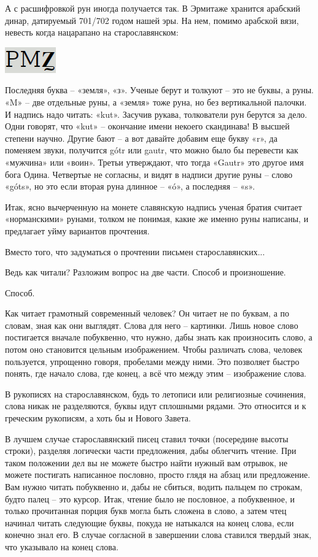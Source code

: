 А с расшифровкой рун иногда получается так. В Эрмитаже хранится арабский динар, датируемый 701/702 годом нашей эры. На нем, помимо арабской вязи, невесть когда нацарапано на старославянском:

\begin{center}
\includegraphics[width=0.20\linewidth]{chast-colebanie-osnov/letyaz/pmz.png}
\end{center} 

Последняя буква – «земля», «з». Ученые берут и толкуют – это не буквы, а руны. «M» – две отдельные руны, а «земля» тоже руна, но без вертикальной палочки. И надпись надо читать: «kut». Засучив рукава, толкователи рун берутся за дело. Одни говорят, что «kut» – окончание имени некоего скандинава! В высшей степени научно. Другие бают – а вот давайте добавим еще букву «r», да поменяем звуки, получится gótr или gautr, что можно было бы перевести как «мужчина» или «воин». Третьи утверждают, что тогда «Gautr» это другое имя бога Одина. Четвертые не согласны, и видят в надписи другие руны – слово «góts», но это если вторая руна длинное – «ó», а последняя – «s».

Итак, ясно вычерченную на монете славянскую надпись ученая братия считает «норманскими» рунами, толком не понимая, какие же именно руны написаны, и предлагает уйму вариантов прочтения.

Вместо того, что задуматься о прочтении письмен старославянских...

Ведь как читали? Разложим вопрос на две части. Способ и произношение.

Способ. 

Как читает грамотный современный человек? Он читает не по буквам, а по словам, зная как они выглядят. Слова для него – картинки. Лишь новое слово постигается вначале побуквенно, что нужно, дабы знать как произносить слово, а потом оно становится цельным изображением. Чтобы различать слова, человек пользуется, упрощенно говоря, пробелами между ними. Это позволяет быстро понять, где начало слова, где конец, а всё что между этим – изображение слова.

В рукописях на старославянском, будь то летописи или религиозные сочинения, слова никак не разделяются, буквы идут сплошными рядами. Это относится и к греческим рукописям, а хоть бы и Нового Завета.

В лучшем случае старославянский писец ставил точки (посередине высоты строки), разделяя логически части предложения, дабы облегчить чтение. При таком положении дел вы не можете быстро найти нужный вам отрывок, не можете постигать написанное пословно, просто глядя на абзац или предложение. Вам нужно читать побуквенно и, дабы не сбиться, водить пальцем  по строкам, будто палец – это курсор. Итак, чтение было не пословное, а побуквенное, и только прочитанная порция букв могла быть сложена в слово, а затем чтец начинал читать следующие буквы, покуда не натыкался на конец слова, если конечно знал его. В случае согласной в завершении слова ставился твердый знак, что указывало на конец слова.

